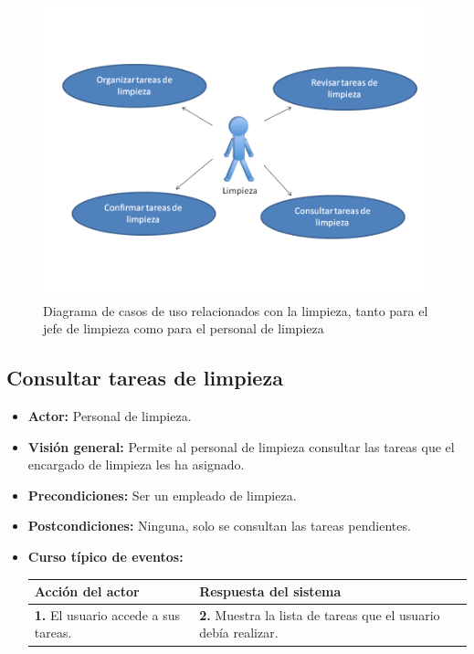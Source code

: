 \documentclass[spanish,a4paper,11pt, twoside]{report}	%
\begin{document}

	\begin{figure}[!h]
		\centering
		\includegraphics[scale=0.5]{Limpieza.png}
		\caption{Diagrama de casos de uso relacionados con la limpieza, tanto para el jefe de limpieza como para el personal de limpieza}
	\end{figure}

	\subsection{Consultar tareas de limpieza}				
			\begin{itemize}
				\item \textbf{Actor:} Personal de limpieza.
				\item \textbf{Visión general:} Permite al personal de limpieza consultar las
					tareas que el encargado de limpieza les ha asignado.
			\item \textbf{Precondiciones:} Ser un empleado de limpieza.
			\item \textbf{Postcondiciones:}  Ninguna, solo se consultan las tareas pendientes.
			\item \textbf{Curso típico de eventos:}\\ 
				\begin{tabular}{|p{6cm}||p{6cm}|}
					\hline
					\textbf{Acción del actor} & \textbf{Respuesta del sistema} \\ \hline \hline
					\textbf{1.} El usuario accede a sus tareas. & 
					\textbf{2.} Muestra la lista de tareas que el usuario debía realizar.\\ \hline 
				\end{tabular}
			\end {itemize}
\end{document}
